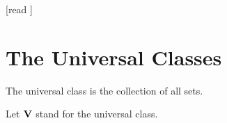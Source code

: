 \documentclass[10pt]{article}
\begin{document}
  \begin{imports}
    \begin{forthel}
      [read ]
    \end{forthel}
  \end{imports}


  \section*{The Universal Classes}

  \begin{forthel}
    \begin{definition}[id=FOUNDATIONS_10_9625487120366325,printid]
      The universal class is the collection of all sets.
    \end{definition}

    Let $\textbf{V}$ stand for the universal class.
  \end{forthel}
\end{document}
